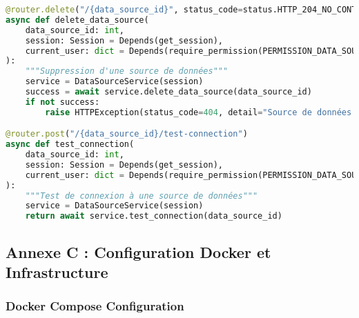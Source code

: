 \begin{lstlisting}[language=Python, caption=Routes API Data Sources]
@router.delete("/{data_source_id}", status_code=status.HTTP_204_NO_CONTENT)
async def delete_data_source(
    data_source_id: int,
    session: Session = Depends(get_session),
    current_user: dict = Depends(require_permission(PERMISSION_DATA_SOURCE_EDIT))
):
    """Suppression d'une source de données"""
    service = DataSourceService(session)
    success = await service.delete_data_source(data_source_id)
    if not success:
        raise HTTPException(status_code=404, detail="Source de données non trouvée")

@router.post("/{data_source_id}/test-connection")
async def test_connection(
    data_source_id: int,
    session: Session = Depends(get_session),
    current_user: dict = Depends(require_permission(PERMISSION_DATA_SOURCE_VIEW))
):
    """Test de connexion à une source de données"""
    service = DataSourceService(session)
    return await service.test_connection(data_source_id)
\end{lstlisting}

\subsection{Annexe C : Configuration Docker et Infrastructure}

\subsubsection{Docker Compose Configuration}

